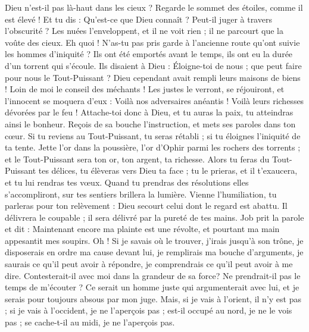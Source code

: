 \begin{multicols}{2}
Dieu n'est-il pas là-haut dans les cieux ? Regarde le sommet des étoiles, comme il est élevé !
Et tu dis : Qu'est-ce que Dieu connaît ? Peut-il juger à travers l'obscurité ?
Les nuées l'enveloppent, et il ne voit rien ; il ne parcourt que la voûte des cieux.
Eh quoi ! N'as-tu pas pris garde à l'ancienne route qu'ont suivie les hommes d'iniquité ?
Ils ont été emportés avant le temps, ils ont eu la durée d'un torrent qui s'écoule.
Ils disaient à Dieu : Éloigne-toi de nous ; que peut faire pour nous le Tout-Puissant ?
Dieu cependant avait rempli leurs maisons de biens ! Loin de moi le conseil des méchants !
Les justes le verront, se réjouiront, et l'innocent se moquera d'eux :
Voilà nos adversaires anéantis ! Voilà leurs richesses dévorées par le feu !
Attache-toi donc à Dieu, et tu auras la paix, tu atteindras ainsi le bonheur.
Reçois de sa bouche l'instruction, et mets ses paroles dans ton cœur.
Si tu reviens au Tout-Puissant, tu seras rétabli ; si tu éloignes l'iniquité de ta tente.
Jette l'or dans la poussière, l'or d'Ophir parmi les rochers des torrents ;
et le Tout-Puissant sera ton or, ton argent, ta richesse.
Alors tu feras du Tout-Puissant tes délices, tu élèveras vers Dieu ta face ;
tu le prieras, et il t'exaucera, et tu lui rendras tes vœux.
Quand tu prendras des résolutions elles s'accompliront, sur tes sentiers brillera la lumière.
Vienne l'humiliation, tu parleras pour ton relèvement : Dieu secourt celui dont le regard est abattu.
Il délivrera le coupable ; il sera délivré par la pureté de tes mains.
\VerseOne{}Job prit la parole et dit :
Maintenant encore ma plainte est une révolte, et pourtant ma main appesantit mes soupirs.
Oh ! Si je savais où le trouver, j'irais jusqu'à son trône,
je disposerais en ordre ma cause devant lui, je remplirais ma bouche d'arguments,
je saurais ce qu'il peut avoir à répondre, je comprendrais ce qu'il peut avoir à me dire.
Contesterait-il avec moi dans la grandeur de sa force? Ne prendrait-il pas le temps de m'écouter ?
Ce serait un homme juste qui argumenterait avec lui, et je serais pour toujours absous par mon juge.
Mais, si je vais à l'orient, il n'y est pas ; si je vais à l'occident, je ne l'aperçois pas ;
est-il occupé au nord, je ne le vois pas ; se cache-t-il au midi, je ne l'aperçois pas.

\end{multicols}
